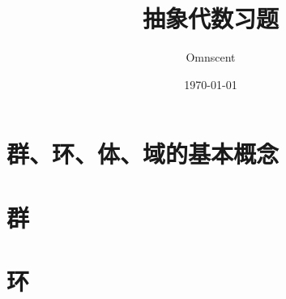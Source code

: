 \documentclass[a4paper,UTF8]{article}  %
\title{抽象代数习题}
\author{Omnscent}
\date{\today}
\begin{document}
\maketitle
\section{群、环、体、域的基本概念}
\addtocounter{subsection}{-1}




\section{群}





\section{环}


\end{document}
